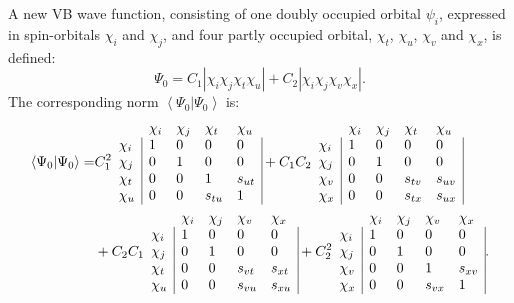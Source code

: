 A new VB wave function, consisting of one doubly occupied orbital $\psi_i$, expressed in spin-orbitals $\chi_i$ and $\chi_j$, and four partly occupied orbital, $\chi_t$, $\chi_u$, $\chi_v$ and $\chi_x$, is defined:
\begin{equation}
\Psi_0 = C_1 |\chi_i\chi_j\chi_t\chi_u|+ C_2 |\chi_i\chi_j\chi_v\chi_x|.
\label{ch2.eq.wfexamp2}
\end{equation}
The corresponding norm $\left< \Psi_0 | \Psi_0 \right>$ is:
\begin{equation}
\begin{split}
\left< \Psi_0 | \Psi_0 \right>=& C_1^2
\begin{array}{lllll}
 &  \chi_i & \chi_j & \chi_t & \chi_u \\
 \chi_i & \multicolumn{1}{|l}{ 1 } & 0 & 0 & \multicolumn{1}{l|}{ 0 } \\
 \chi_j & \multicolumn{1}{|l}{ 0 } & 1 & 0 & \multicolumn{1}{l|}{ 0 } \\
 \chi_t & \multicolumn{1}{|l}{ 0 } & 0 & 1 & \multicolumn{1}{l|}{s_{ut}} \\
 \chi_u & \multicolumn{1}{|l}{ 0 } & 0 & s_{tu} & \multicolumn{1}{l|}{1}
\end{array}+ C_1C_2
\begin{array}{lllll}
 &  \chi_i & \chi_j & \chi_t & \chi_u \\
 \chi_i & \multicolumn{1}{|l}{ 1 } & 0 & 0 & \multicolumn{1}{l|}{ 0 } \\
 \chi_j & \multicolumn{1}{|l}{ 0 } & 1 & 0 & \multicolumn{1}{l|}{ 0 } \\
 \chi_v & \multicolumn{1}{|l}{ 0 } & 0 & s_{tv} & \multicolumn{1}{l|}{s_{uv}} \\
 \chi_x & \multicolumn{1}{|l}{ 0 } & 0 & s_{tx} & \multicolumn{1}{l|}{s_{ux}}
\end{array} \\
& + C_2 C_1\begin{array}{lllll}
 &  \chi_i & \chi_j & \chi_v & \chi_x \\
 \chi_i & \multicolumn{1}{|l}{ 1 } & 0 & 0 & \multicolumn{1}{l|}{ 0 } \\
 \chi_j & \multicolumn{1}{|l}{ 0 } & 1 & 0 & \multicolumn{1}{l|}{ 0 } \\
 \chi_t & \multicolumn{1}{|l}{ 0 } & 0 & s_{vt} & \multicolumn{1}{l|}{s_{xt}} \\
 \chi_u & \multicolumn{1}{|l}{ 0 } & 0 & s_{vu} & \multicolumn{1}{l|}{s_{xu}}
\end{array}+ C_2^2
\begin{array}{lllll}
 &  \chi_i & \chi_j & \chi_v & \chi_x \\
 \chi_i & \multicolumn{1}{|l}{ 1 } & 0 & 0 & \multicolumn{1}{l|}{ 0 } \\
 \chi_j & \multicolumn{1}{|l}{ 0 } & 1 & 0 & \multicolumn{1}{l|}{ 0 } \\
 \chi_v & \multicolumn{1}{|l}{ 0 } & 0 & 1 & \multicolumn{1}{l|}{s_{xv}} \\
 \chi_x & \multicolumn{1}{|l}{ 0 } & 0 & s_{vx} & \multicolumn{1}{l|}{ 1 }
\end{array}.
\end{split}
\label{ch2.eq.s02}
\end{equation}

